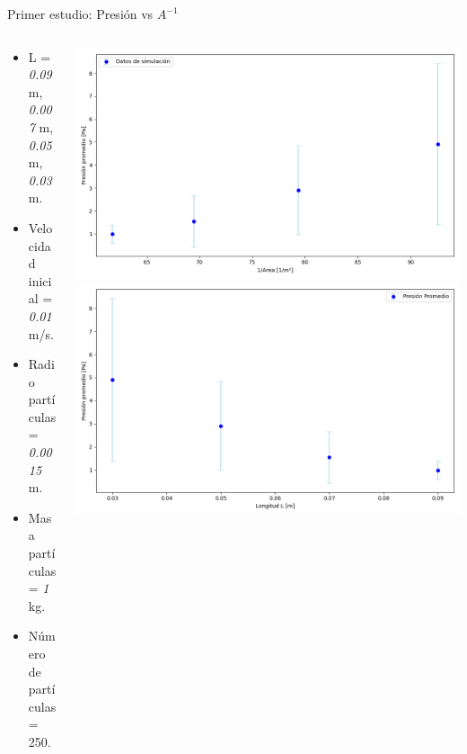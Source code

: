 \documentclass{beamer}
\begin{document}
\begin{frame}{Primer estudio: Presión vs $A^{-1}$}
  \begin{columns}
    \begin{column}{0.40\textwidth}
      \scriptsize {}
      \begin{itemize}
        \item L = \textit{0.09} m, \textit{0.007} m, \textit{0.05} m, \textit{0.03} m. 
        \item Velocidad inicial = \textit{0.01} m/s.
        \item Radio partículas = \textit{0.0015} m.
        \item Masa partículas = \textit{1} kg.
        \item Número de partículas = 250.
      \end{itemize}
    \end{column}
    \begin{column}{0.60\textwidth}
      \includegraphics[width=1\linewidth]{photoMaterial/Presion_vs_area.png} %
      \includegraphics[width=1\linewidth]{photoMaterial/Presion_vs_L.png}
    \end{column}
  \end{columns}
\end{frame}
\end{document}
